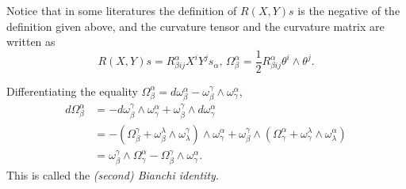 Notice that in some literatures the definition of $R(X,Y)s$ is the negative of the definition given above, and the curvature tensor and the curvature matrix are written as
$$R(X,Y)s=R^\alpha_{\beta ij}X^iY^js_\alpha,\,\Omega_\beta^\alpha=\frac{1}{2}R^\alpha_{\beta ij}\theta^i\wedge\theta^j.$$

Differentiating the equality $\Omega_\beta^\alpha=d\omega_\beta^\alpha-\omega_\beta^\gamma\wedge\omega_\gamma^\alpha$,
$$
\begin{aligned}
d\Omega_\beta^\alpha&=-d\omega_\beta^\gamma\wedge\omega_\gamma^\alpha+\omega_\beta^\gamma\wedge d\omega_\gamma^\alpha\\
&=-(\Omega_\beta^\gamma+\omega_\beta^\lambda\wedge\omega_\lambda^\gamma)\wedge\omega_\gamma^\alpha
+\omega_\beta^\gamma\wedge(\Omega_\gamma^\alpha+\omega_\gamma^\lambda\wedge\omega_\lambda^\alpha)\\
&=\omega_\beta^\gamma\wedge\Omega_\gamma^\alpha-\Omega_\beta^\gamma\wedge\omega_\gamma^\alpha.
\end{aligned}
$$
This is called the \emph{(second) Bianchi identity}.